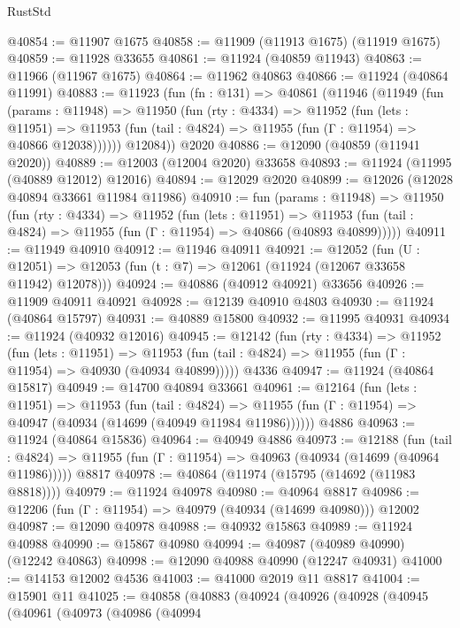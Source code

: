 \begin{lexlean}{RustStd}
\begin{coremodule}
@40854 := @11907 @1675
@40858 := @11909 (@11913 @1675) (@11919 @1675)
@40859 := @11928 @33655
@40861 := @11924 (@40859 @11943)
@40863 := @11966 (@11967 @1675)
@40864 := @11962 @40863
@40866 := @11924 (@40864 @11991)
@40883 := @11923
    (fun (fn : @131) =>
    @40861
      (@11946
        (@11949
          (fun (params : @11948) =>
          @11950
            (fun (rty : @4334) =>
            @11952
              (fun (lets : @11951) =>
              @11953 (fun (tail : @4824) => @11955 (fun (Γ : @11954) => @40866 @12038))))))
        @12084))
    @2020
@40886 := @12090 (@40859 (@11941 @2020))
@40889 := @12003 (@12004 @2020) @33658
@40893 := @11924 (@11995 (@40889 @12012) @12016)
@40894 := @12029 @2020
@40899 := @12026 (@12028 @40894 @33661 @11984 @11986)
@40910 := fun (params : @11948) =>
  @11950
    (fun (rty : @4334) =>
    @11952
      (fun (lets : @11951) =>
      @11953 (fun (tail : @4824) => @11955 (fun (Γ : @11954) => @40866 (@40893 @40899)))))
@40911 := @11949 @40910
@40912 := @11946 @40911
@40921 := @12052
    (fun (U : @12051) => @12053 (fun (t : @7) => @12061 (@11924 (@12067 @33658 @11942) @12078)))
@40924 := @40886 (@40912 @40921) @33656
@40926 := @11909 @40911 @40921
@40928 := @12139 @40910 @4803
@40930 := @11924 (@40864 @15797)
@40931 := @40889 @15800
@40932 := @11995 @40931
@40934 := @11924 (@40932 @12016)
@40945 := @12142
    (fun (rty : @4334) =>
    @11952
      (fun (lets : @11951) =>
      @11953 (fun (tail : @4824) => @11955 (fun (Γ : @11954) => @40930 (@40934 @40899)))))
    @4336
@40947 := @11924 (@40864 @15817)
@40949 := @14700 @40894 @33661
@40961 := @12164
    (fun (lets : @11951) =>
    @11953
      (fun (tail : @4824) =>
      @11955 (fun (Γ : @11954) => @40947 (@40934 (@14699 (@40949 @11984 @11986))))))
    @4886
@40963 := @11924 (@40864 @15836)
@40964 := @40949 @4886
@40973 := @12188
    (fun (tail : @4824) => @11955 (fun (Γ : @11954) => @40963 (@40934 (@14699 (@40964 @11986)))))
    @8817
@40978 := @40864 (@11974 (@15795 (@14692 (@11983 @8818))))
@40979 := @11924 @40978
@40980 := @40964 @8817
@40986 := @12206 (fun (Γ : @11954) => @40979 (@40934 (@14699 @40980))) @12002
@40987 := @12090 @40978
@40988 := @40932 @15863
@40989 := @11924 @40988
@40990 := @15867 @40980
@40994 := @40987 (@40989 @40990) (@12242 @40863)
@40998 := @12090 @40988 @40990 (@12247 @40931)
@41000 := @14153 @12002 @4536
@41003 := @41000 @2019 @11 @8817
@41004 := @15901 @11
@41025 := @40858
    (@40883
      (@40924
        (@40926
          (@40928
            (@40945
              (@40961
                (@40973
                  (@40986
                    (@40994

\end{coremodule}
\end{lexlean}
